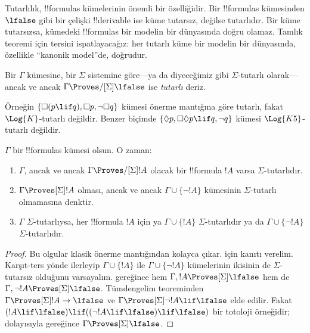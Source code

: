 



Tutarlılık, !!{formula}s kümelerinin önemli bir özelliğidir. Bir !!{formula}s
kümesinden $\lfalse$ gibi bir çelişki !!{derivable} ise küme tutarsız,
değilse tutarlıdır. Bir küme tutarsızsa, kümedeki !!{formula}s bir modelin
bir dünyasında doğru olamaz. Tamlık teoremi için tersini ispatlayacağız: her
tutarlı küme bir modelin bir dünyasında, özellikle ``kanonik model''de,
doğrudur.

\begin{defn}
  Bir $\Gamma$ kümesine, bir $\Sigma$ sistemine göre---ya da diyeceğimiz
  gibi $\Sigma$-tutarlı olarak---ancak ve ancak
  $\Gamma\Proves/[\Sigma]\lfalse$ ise \emph{tutarlı} deriz.
\end{defn}

Örneğin $\{\Box(p\lif q),\Box p,\lnot\Box q\}$ kümesi önerme mantığına
göre tutarlı, fakat $\Log{K}$-tutarlı değildir. Benzer biçimde
$\{\Diamond p,\Box\Diamond p\lif q,\lnot q\}$ kümesi
$\Log{K5}$-tutarlı değildir.

\begin{prop}
  $\Gamma$ bir !!{formula}s kümesi olsun. O zaman:
  \begin{enumerate}
  \item $\Gamma$, ancak ve ancak $\Gamma\Proves/[\Sigma]!A$ olacak bir
    !!{formula} $!A$ varsa $\Sigma$-tutarlıdır.
  \item {}%
    $\Gamma\Proves[\Sigma]!A$ olması, ancak ve ancak
    $\Gamma\cup\{\lnot!A\}$ kümesinin $\Sigma$-tutarlı olmamasına denktir.
  \item {}%
    $\Gamma$ $\Sigma$-tutarlıysa, her !!{formula} $!A$ için ya
    $\Gamma\cup\{!A\}$ $\Sigma$-tutarlıdır ya da
    $\Gamma\cup\{\lnot!A\}$ $\Sigma$-tutarlıdır.
  \end{enumerate}
\end{prop}

\begin{proof}
  Bu olgular klasik önerme mantığından kolayca çıkar.
   için kanıtı verelim. Karşıt-ters yönde
  ilerleyip $\Gamma\cup\{!A\}$ ile
  $\Gamma\cup\{\lnot!A\}$ kümelerinin ikisinin de $\Sigma$-tutarsız
  olduğunu varsayalım.
   gereğince hem
  $\Gamma,!A\Proves[\Sigma]\lfalse$ hem de
  $\Gamma,\lnot!A\Proves[\Sigma]\lfalse$. Tümdengelim teoreminden
  $\Gamma\Proves[\Sigma]!A\to\lfalse$ ve
  $\Gamma\Proves[\Sigma]\lnot!A\lif\lfalse$ elde edilir. Fakat
  $(!A\lif\lfalse)\lif((\lnot!A\lif\lfalse)\lif\lfalse)$ bir totoloji
  örneğidir; dolayısıyla
  gereğince $\Gamma\Proves[\Sigma]\lfalse$.
\end{proof}

